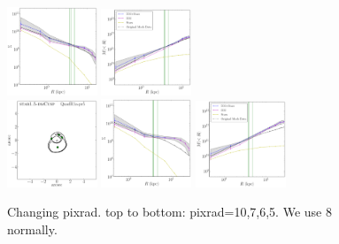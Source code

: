 \documentclass[galley,usenatbib]{mn2e}
\begin{document}
\begin{figure}
\includegraphics[width=0.24\textwidth]{BCQuadR1a-pr6_TmS-b.pdf}
\includegraphics[width=0.24\textwidth]{BCQuadR1a-pr6_TmS-c.pdf} \\
\includegraphics[width=0.24\textwidth]{BCQuadR1a-pr5_TmS-a.pdf}
\includegraphics[width=0.24\textwidth]{BCQuadR1a-pr5_TmS-b.pdf}
\includegraphics[width=0.24\textwidth]{BCQuadR1a-pr5_TmS-c.pdf} \\
\caption{Changing pixrad. top to bottom: pixrad=10,7,6,5. We use 8 normally.}
\label{fig:pix_convergence_test}
\end{figure}



\end{document}
